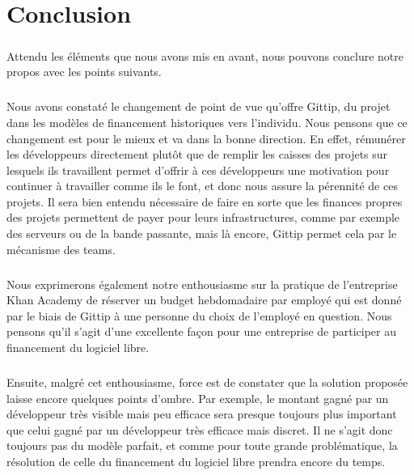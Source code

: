 \chapter*{Conclusion}



\paragraph{}
Attendu les éléments que nous avons mis en avant, nous pouvons conclure notre 
propos avec les points suivants.

\paragraph{}
Nous avons constaté le changement de point de vue qu'offre Gittip, du projet 
dans les modèles de financement historiques vers l'individu.
Nous pensons que ce changement est pour le mieux et va dans la bonne 
direction.
En effet, rémunérer les développeurs directement plutôt que de remplir les 
caisses des projets sur lesquels ils travaillent permet d'offrir à ces 
développeurs une motivation pour continuer à travailler comme ils le font, et 
donc nous assure la pérennité de ces projets.
Il sera bien entendu nécessaire de faire en sorte que les finances propres des 
projets permettent de payer pour leurs infrastructures, comme par exemple des 
serveurs ou de la bande passante, mais là encore, Gittip permet cela par le 
mécanisme des teams.

\paragraph{}
Nous exprimerons également notre enthousiasme sur la pratique de l'entreprise 
Khan Academy de réserver un budget hebdomadaire par employé qui est donné par 
le biais de Gittip à une personne du choix de l'employé en question.
Nous pensons qu'il s'agit d'une excellente façon pour une entreprise de 
participer au financement du logiciel libre.

\paragraph{}
Ensuite, malgré cet enthousiasme, force est de constater que la solution 
proposée laisse encore quelques points d'ombre. Par exemple, le montant gagné 
par un développeur très visible mais peu efficace sera presque toujours plus 
important que celui gagné par un développeur très efficace mais discret.
Il ne s'agit donc toujours pas du modèle parfait, et comme pour toute grande 
problématique, la résolution de celle du financement du logiciel libre prendra 
encore du temps.

